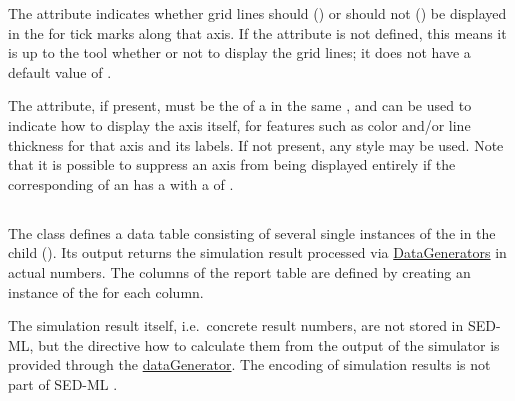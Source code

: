\begin{blockChanged}
\begin{blockChanged}
The  attribute indicates whether grid lines should () or should not () be displayed in the \Plot for tick marks along that axis.  If the  attribute is not defined, this means it is up to the tool whether or not to display the grid lines; it does not have a default value of .
\end{blockChanged}

The  attribute, if present, must be the  of a \Style in the same \SedDocument, and can be used to indicate how to display the axis itself, for features such as color and/or line thickness for that axis and its labels.  If not present, any style may be used.  Note that it is possible to suppress an axis from being displayed entirely if the corresponding \Style of an \Axis has a  with a  of .



\end{blockChanged}
%


\subsection{}
\label{class:report}
\label{class:listOfDataSets}
\begin{blockChanged}
The  class defines a data table consisting of several single instances of the \DataSet in the child  (). Its output returns the simulation result processed via \hyperref[class:dataGenerator]{DataGenerators} in actual numbers. The columns of the report table are defined by creating an instance of the \DataSet for each column. 
\end{blockChanged}

The simulation result itself, i.e.\ concrete result numbers, are not stored in SED-ML, but the directive how to calculate them from the output of the simulator is provided through the \hyperref[class:dataGenerator]{dataGenerator}. The encoding of simulation results is not part of SED-ML \currentLV.

